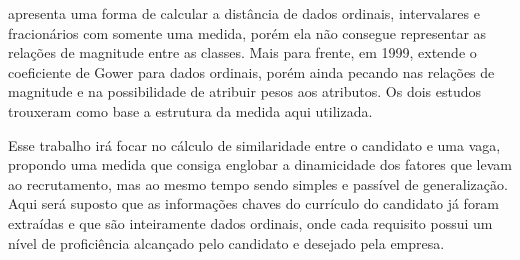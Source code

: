 \documentclass[preprint,12pt]{elsarticle}
\begin{document}

\cite{analysis-cluster} apresenta uma forma de calcular a distância de dados ordinais, intervalares e fracionários com somente uma medida, porém ela não consegue representar as relações de magnitude entre as classes. Mais para frente, em 1999, \cite{analysis-cluster} extende o coeficiente de Gower para dados ordinais, porém ainda pecando nas relações de magnitude e na possibilidade de atribuir pesos aos atributos. Os dois estudos trouxeram como base a estrutura da medida aqui utilizada.

Esse trabalho irá focar no cálculo de similaridade entre o candidato e uma vaga, propondo uma medida que consiga englobar a dinamicidade dos fatores que levam ao recrutamento, mas ao mesmo tempo sendo simples e passível de generalização. Aqui será suposto que as informações chaves do currículo do candidato já foram extraídas e que são inteiramente dados ordinais, onde cada requisito possui um nível de proficiência alcançado pelo candidato e desejado pela empresa.

\end{document}
